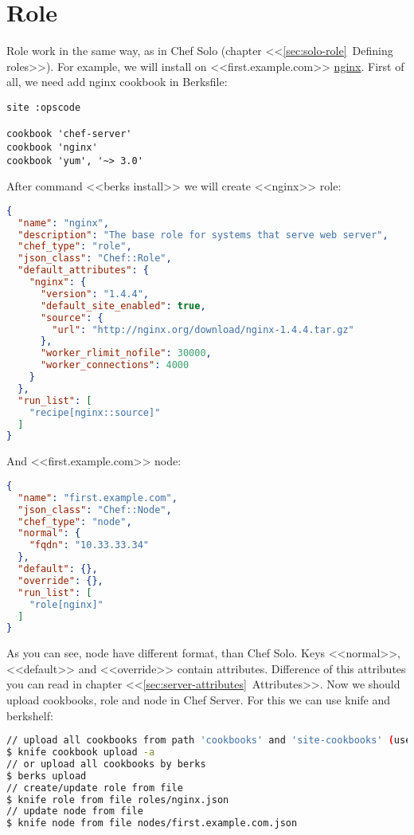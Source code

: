 \section{Role}

Role work in the same way, as in Chef Solo (chapter <<\ref{sec:solo-role}~Defining roles>>). For example, we will install on <<first.example.com>> \href{http://community.opscode.com/cookbooks/nginx}{nginx}. First of all, we need add nginx cookbook in Berksfile:

\begin{lstlisting}[label=lst:my-serer-cloud-role1,title=my-server-cloud/Berksfile]
site :opscode

cookbook 'chef-server'
cookbook 'nginx'
cookbook 'yum', '~> 3.0'
\end{lstlisting}

After command <<berks install>> we will create <<nginx>> role:

\begin{lstlisting}[language=JSON,label=lst:my-serer-cloud-role2,title=my-server-cloud/roles/nginx.json]
{
  "name": "nginx",
  "description": "The base role for systems that serve web server",
  "chef_type": "role",
  "json_class": "Chef::Role",
  "default_attributes": {
    "nginx": {
      "version": "1.4.4",
      "default_site_enabled": true,
      "source": {
        "url": "http://nginx.org/download/nginx-1.4.4.tar.gz"
      },
      "worker_rlimit_nofile": 30000,
      "worker_connections": 4000
    }
  },
  "run_list": [
    "recipe[nginx::source]"
  ]
}
\end{lstlisting}

And <<first.example.com>> node:

\begin{lstlisting}[language=JSON,label=lst:my-serer-cloud-role3,title=my-server-cloud/nodes/first.example.com.json]
{
  "name": "first.example.com",
  "json_class": "Chef::Node",
  "chef_type": "node",
  "normal": {
    "fqdn": "10.33.33.34"
  },
  "default": {},
  "override": {},
  "run_list": [
    "role[nginx]"
  ]
}
\end{lstlisting}

As you can see, node have different format, than Chef Solo. Keys <<normal>>, <<default>> and <<override>> contain attributes. Difference of this attributes you can read in chapter <<\ref{sec:server-attributes}~Attributes>>. Now we should upload cookbooks, role and node in Chef Server. For this we can use knife and berkshelf:

\begin{lstlisting}[language=Bash,label=lst:my-serer-cloud-role4]
// upload all cookbooks from path 'cookbooks' and 'site-cookbooks' (use --force if cookbook frozen)
$ knife cookbook upload -a
// or upload all cookbooks by berks
$ berks upload
// create/update role from file
$ knife role from file roles/nginx.json
// update node from file
$ knife node from file nodes/first.example.com.json
\end{lstlisting}

